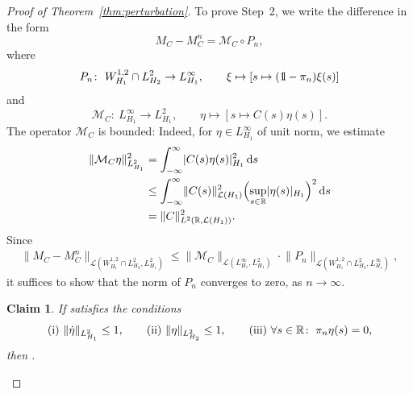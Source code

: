 \documentclass[pdftex]{sigma}
\numberwithin{equation}{section}
\newtheorem*{Claim*}{Claim}
\newcommand{\R}{{\mathbb{R}}}
\newcommand{\Ll}{{\mathcal{L}}} %
\newcommand{\Mm}{{\mathcal{M}}} %
\newcommand{\norm}{{\rm norm}}
\def\abs#1{\mathopen|#1\mathclose|}
\def\norm#1{\mathopen\|#1\mathclose\|}
\newcommand{\1}{{{\mathchoice {\rm 1\mskip-4mu l} {\rm 1\mskip-4mu l}
{\rm 1\mskip-4.5mu l} {\rm 1\mskip-5mu l}}}}
\begin{document}
\begin{proof}[Proof of Theorem~\ref{thm:perturbation}]
\medskip \noindent
To prove Step~2, we write the difference in the form
\[
 M_C-M_C^n=\Mm_C\circ P_n,
\]
where
\[
 P_n\colon\
 W^{1,2}_{H_1}\cap L^2_{H_2}\to L^\infty_{H_1}
 ,\qquad \xi\mapsto [s\mapsto (\1-\pi_n )\xi(s) ]
\]
and
\[
 \Mm_C\colon\
 L^\infty_{H_1}\to L^2_{H_1}
 ,\qquad \eta\mapsto [s\mapsto C(s)\eta(s) ] .
\]
The operator $\Mm_C$ is bounded: Indeed, for
$\eta\in L^\infty_{H_1}$ of unit norm, we estimate
\begin{equation*}
\begin{split}
 \norm{\Mm_C \eta}_{L^2_{H_1}}^2
 &=\int_{-\infty}^\infty\abs{C(s)\eta(s)}_{H_1}^2\, {\rm d}s\\
 &\le \int_{-\infty}^\infty\norm{C(s)}_{\Ll(H_1)}^2
 \Bigl(\sup_{s\in\R}\abs{\eta(s)}_{H_1} \Bigr)^2\, {\rm d}s\\
 &=\norm{C}_{L^2(\R,\Ll(H_1))}^2 .
\end{split}
\end{equation*}
Since
\begin{equation*}
\begin{split}
 \norm{M_C-M^n_C}_{\Ll(W^{1,2}_{H_1}\cap L^2_{H_2},L^2_{H_1})}
 \le
 \norm{\Mm_C}_{\Ll(L^\infty_{H_1}, L^2_{H_1})}\cdot
 \norm{P_n}_{\Ll(W^{1,2}_{H_1}\cap L^2_{H_2},L^\infty_{H_1})},
\end{split}
\end{equation*}
it suffices to show that the norm of $P_n$ converges to zero, as
$n\to\infty$.

\begin{Claim*}
If  satisfies the conditions
\[
 \text{\rm (i) $\norm{\dot \eta}_{L^2_{H_1}}\le1$}
 ,\qquad
 \text{\rm (ii) $\norm{\eta}_{L^2_{H_2}}\le1$}
 ,\qquad
 \text{\rm (iii) $\forall s\in\R\colon\;\pi_n\eta(s)=0$,}
\]
then
\smash{$
 \norm{\eta}_{L^\infty_{H_1}}
 \le\bigl(\frac{3}{h_{n+1}}\bigr)^\frac{1}{4}
$}.
\end{Claim*}


\end{proof}
\end{document}

